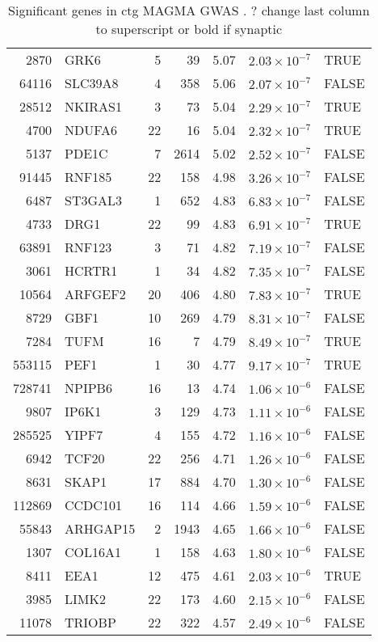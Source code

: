 \begin{table}[ht]
\begin{tabular}{rlrrrrl}
  2870 & GRK6 &   5 &  39 & 5.07 & $2.03 \times 10^{-7}$ & TRUE \\ 
  64116 & SLC39A8 &   4 & 358 & 5.06 & $2.07 \times 10^{-7}$ & FALSE \\ 
  28512 & NKIRAS1 &   3 &  73 & 5.04 & $2.29 \times 10^{-7}$ & TRUE \\ 
  4700 & NDUFA6 &  22 &  16 & 5.04 & $2.32 \times 10^{-7}$ & TRUE \\ 
  5137 & PDE1C &   7 & 2614 & 5.02 & $2.52 \times 10^{-7}$ & FALSE \\ 
  91445 & RNF185 &  22 & 158 & 4.98 & $3.26 \times 10^{-7}$ & FALSE \\ 
  6487 & ST3GAL3 &   1 & 652 & 4.83 & $6.83 \times 10^{-7}$ & FALSE \\ 
  4733 & DRG1 &  22 &  99 & 4.83 & $6.91 \times 10^{-7}$ & TRUE \\ 
  63891 & RNF123 &   3 &  71 & 4.82 & $7.19 \times 10^{-7}$ & FALSE \\ 
  3061 & HCRTR1 &   1 &  34 & 4.82 & $7.35 \times 10^{-7}$ & FALSE \\ 
  10564 & ARFGEF2 &  20 & 406 & 4.80 & $7.83 \times 10^{-7}$ & TRUE \\ 
  8729 & GBF1 &  10 & 269 & 4.79 & $8.31 \times 10^{-7}$ & FALSE \\ 
  7284 & TUFM &  16 &   7 & 4.79 & $8.49 \times 10^{-7}$ & TRUE \\ 
  553115 & PEF1 &   1 &  30 & 4.77 & $9.17 \times 10^{-7}$ & TRUE \\ 
  728741 & NPIPB6 &  16 &  13 & 4.74 & $1.06 \times 10^{-6}$ & FALSE \\ 
  9807 & IP6K1 &   3 & 129 & 4.73 & $1.11 \times 10^{-6}$ & FALSE \\ 
  285525 & YIPF7 &   4 & 155 & 4.72 & $1.16 \times 10^{-6}$ & FALSE \\ 
  6942 & TCF20 &  22 & 256 & 4.71 & $1.26 \times 10^{-6}$ & FALSE \\ 
  8631 & SKAP1 &  17 & 884 & 4.70 & $1.30 \times 10^{-6}$ & FALSE \\ 
  112869 & CCDC101 &  16 & 114 & 4.66 & $1.59 \times 10^{-6}$ & FALSE \\ 
  55843 & ARHGAP15 &   2 & 1943 & 4.65 & $1.66 \times 10^{-6}$ & FALSE \\ 
  1307 & COL16A1 &   1 & 158 & 4.63 & $1.80 \times 10^{-6}$ & FALSE \\ 
  8411 & EEA1 &  12 & 475 & 4.61 & $2.03 \times 10^{-6}$ & TRUE \\ 
  3985 & LIMK2 &  22 & 173 & 4.60 & $2.15 \times 10^{-6}$ & FALSE \\ 
  11078 & TRIOBP &  22 & 322 & 4.57 & $2.49 \times 10^{-6}$ & FALSE \\ 
   \hline
\end{tabular}
\caption{Significant genes in ctg MAGMA GWAS \cite{sniekers2017genome}. ? change last column to superscript or bold if synaptic} 
\label{tab:Significant genes in ctg MAGMA GWAS}
\end{table}



